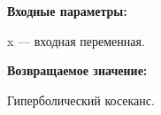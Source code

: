 \textbf{Входные параметры:}

 x --- входная переменная.

\textbf{Возвращаемое значение:}

Гиперболический косеканс.